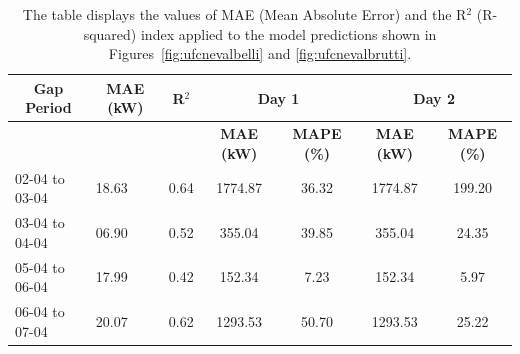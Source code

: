 \begin{table}[H]
	\begin{center}
		\begin{tabular}[c]{l|l|l|c|c|c|c}
			\multicolumn{1}{c|}{\textbf{Gap Period}} &
			\multicolumn{1}{c|}{\textbf{MAE (kW)}}   &
			\multicolumn{1}{c|}{\textbf{R}$^2$}      &
			\multicolumn{2}{c|}{\textbf{Day 1}}      &
			\multicolumn{2}{c}{\textbf{Day 2}}                                                                                                                                \\
			\hline

			                                         &       &      & \tiny \textbf{MAE (kW)} & \tiny \textbf{MAPE (\%)} & \tiny \textbf{MAE (kW)} & \tiny \textbf{MAPE (\%)} \\
			02-04 to 03-04                           & 18.63 & 0.64 & 1774.87                 & 36.32                    & 1774.87                 & 199.20                   \\
			03-04 to 04-04                           & 06.90 & 0.52 & 355.04                  & 39.85                    & 355.04                  & 24.35                    \\
			05-04 to 06-04                           & 17.99 & 0.42 & 152.34                  & 7.23                     & 152.34                  & 5.97                     \\
			06-04 to 07-04                           & 20.07 & 0.62 & 1293.53                 & 50.70                    & 1293.53                 & 25.22                    \\
		\end{tabular}
	\end{center}
	\caption{The table displays the values of MAE (Mean Absolute Error)\cite{metrics} and the R$^2$ (R-squared)\cite{metrics} index applied to the model predictions shown in Figures~\ref{fig:ufcnevalbelli} and \ref{fig:ufcnevalbrutti}.}\label{tab:grrundatitab1}
\end{table}

